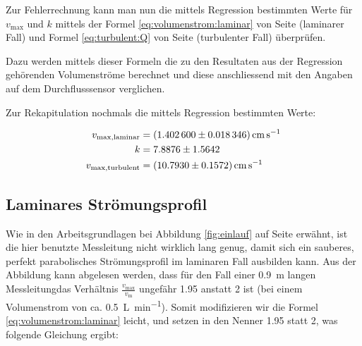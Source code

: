 Zur Fehlerrechnung kann man nun  die mittels Regression bestimmten Werte f\"ur
$v_{\mathrm{max}}$  und $k$  mittels der  Formel \ref{eq:volumenstrom:laminar}
von  Seite  \pageref{eq:volumenstrom:laminar}   (laminarer  Fall)  und  Formel
\ref{eq:turbulent:Q}  von  Seite \pageref{eq:turbulent:Q}  (turbulenter  Fall)
\"uberpr\"ufen.

Dazu werden  mittels dieser Formeln die  zu den Resultaten aus  der Regression
geh\"orenden Volumenstr\"ome berechnet und diese anschliessend mit den Angaben
auf dem Durchflusssensor verglichen.

Zur Rekapitulation nochmals die mittels Regression bestimmten Werte:

\begin{align}
    \label{eq:profile:laminar:regression:results:vmax:rekap}
    v_{\mathrm{max, laminar}} &= \SI{1.4026 \pm 0.018346}{\centi\meter\per\second}
    \\
    \label{eq:profile:turb:regression:results:k:rekap}
    k &= 7.8876 \pm 1.5642
    \\
    \label{eq:profile:turb:regression:results:vmax:rekap}
    v_{\mathrm{max, turbulent}} &= \SI{10.793 \pm 0.1572}{\centi\meter\per\second}
\end{align}

\subsection{Laminares Str\"omungsprofil}
\label{subsec:error:laminar}

Wie   in   den   Arbeitsgrundlagen   bei   Abbildung   \ref{fig:einlauf}   auf
Seite    \pageref{fig:einlauf}    erw\"ahnt,    ist    die    hier    benutzte
Messleitung   nicht   wirklich   lang   genug,  damit   sich   ein   sauberes,
perfekt   parabolisches   Str\"omungsprofil   im  laminaren   Fall   ausbilden
kann. Aus    der    Abbildung    kann    abgelesen    werden,    dass    f\"ur
den   Fall    einer   \SI{0.9}{\meter}    langen   Messleitung\footnotemark[6]
das    Verh\"altnis    $\frac{v_{\mathrm{max}}}{v_{\mathrm{m}}}$    ungef\"ahr
\num{1.95}    anstatt    \num{2}    ist   (bei    einem    Volumenstrom    von
ca. \SI{0.5}{\liter\per\minute}). Somit    modifizieren    wir   die    Formel
\ref{eq:volumenstrom:laminar}  leicht, und  setzen  in  den Nenner  \num{1.95}
statt \num{2}, was folgende Gleichung ergibt:


